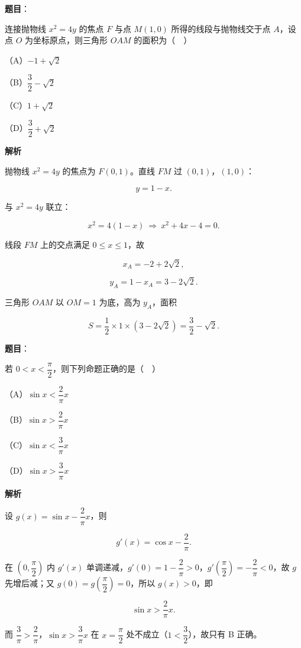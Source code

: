 \begin{answer}

\textbf{题目}：

连接抛物线 $x^2=4y$ 的焦点 $F$ 与点 $M(1,0)$ 所得的线段与抛物线交于点 $A$，设点 $O$ 为坐标原点，则三角形 $OAM$ 的面积为（　）

（A）$-1+\sqrt2$

（B）$\dfrac32-\sqrt2$

（C）$1+\sqrt2$

（D）$\dfrac32+\sqrt2$

\textbf{解析}

抛物线 $x^2=4y$ 的焦点为 $F(0,1)$。直线 $FM$ 过 $(0,1)$，$(1,0)$：

\nopagebreak[4]
\[y=1-x.\]

与 $x^2=4y$ 联立：

\nopagebreak[4]
\[x^2=4(1-x)\ \Rightarrow\ x^2+4x-4=0.\]

线段 $FM$ 上的交点满足 $0\leqslant x\leqslant1$，故

\nopagebreak[4]
\[x_A=-2+2\sqrt2,\]

\nopagebreak[4]
\[y_A=1-x_A=3-2\sqrt2.\]

三角形 $OAM$ 以 $OM=1$ 为底，高为 $y_A$，面积

\nopagebreak[4]
\[S=\frac12\times1\times(3-2\sqrt2)=\frac32-\sqrt2.\]


\end{answer}
\begin{answer}

\textbf{题目}：

若 $0<x<\dfrac{\pi}{2}$，则下列命题正确的是（　）

（A）$\sin x<\dfrac2\pi x$

（B）$\sin x>\dfrac2\pi x$

（C）$\sin x<\dfrac3\pi x$

（D）$\sin x>\dfrac3\pi x$

\textbf{解析}

设 $g(x)=\sin x-\dfrac2\pi x$，则

\nopagebreak[4]
\[g'(x)=\cos x-\frac2\pi.\]

在 $\left(0,\dfrac{\pi}{2}\right)$ 内 $g'(x)$ 单调递减，$g'(0)=1-\dfrac2\pi>0$，$g'\left(\dfrac{\pi}{2}\right)=-\dfrac2\pi<0$，故 $g$ 先增后减；又 $g(0)=g\left(\dfrac{\pi}{2}\right)=0$，所以 $g(x)>0$，即

\nopagebreak[4]
\[\sin x>\frac2\pi x.\]

而 $\dfrac3\pi>\dfrac2\pi$，$\sin x>\dfrac3\pi x$ 在 $x=\dfrac{\pi}{2}$ 处不成立（$1<\dfrac32$），故只有 B 正确。


\end{answer}
